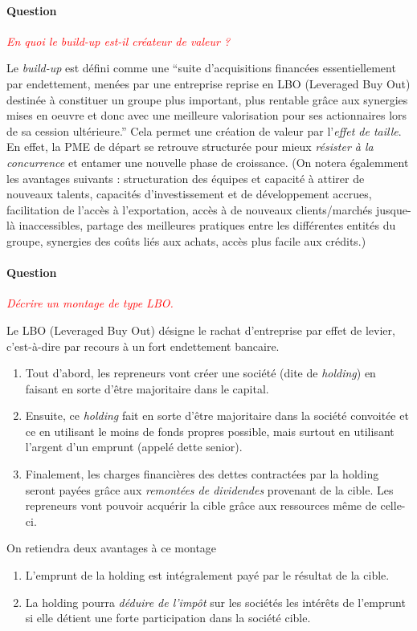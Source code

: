 \documentclass[12pt,oneside,a4paper]{article}
\newcommand{\question}[1]
{
\addtocounter{section}{1}
\paragraph*{Question \thesection}
\emph{\textcolor{red}{#1}}
}
\begin{document}
\question{En quoi le build-up est-il créateur de valeur ?}
Le \emph{build-up} est défini comme une ``suite d'acquisitions financées essentiellement
par endettement, menées par une entreprise reprise en LBO (Leveraged Buy Out) destinée 
à constituer un groupe plus important, plus rentable grâce aux synergies mises en oeuvre 
et donc avec une meilleure valorisation pour ses actionnaires lors de sa cession ultérieure.''
Cela permet une création de valeur par l'\emph{effet de taille}.
En effet, la PME de départ se retrouve structurée 
pour mieux \emph{résister à la concurrence} et entamer une nouvelle phase de croissance.
(On notera égalemment les avantages suivants : 
structuration des équipes et capacité à attirer de nouveaux talents,
capacités d’investissement et de développement accrues,
facilitation de l’accès à l’exportation, 
accès à de nouveaux clients/marchés jusque-là inaccessibles,
partage des meilleures pratiques entre les différentes entités du groupe,
synergies des coûts liés aux achats, accès plus facile aux crédits.)

\question{Décrire un montage de type LBO.}
Le LBO (Leveraged Buy Out) désigne le rachat d'entreprise par effet de levier,
c'est-à-dire par recours à un fort endettement bancaire.
\begin{enumerate}
  \item Tout d'abord, les repreneurs vont créer une société (dite de \emph{holding})
  en faisant en sorte d'être majoritaire dans le capital.
  \item Ensuite, ce \emph{holding} fait en sorte d'être majoritaire dans la société
  convoitée et ce en utilisant le moins de fonds propres possible, mais surtout
  en utilisant l'argent d'un emprunt (appelé dette senior).
  \item Finalement, les charges financières des dettes contractées par la holding
  seront payées grâce aux \emph{remontées de dividendes} provenant de la cible. 
  Les repreneurs vont pouvoir acquérir la cible grâce aux ressources même de celle-ci.
\end{enumerate}
On retiendra deux avantages à ce montage
\begin{enumerate}
  \item L'emprunt de la holding est intégralement payé par le résultat de la cible.
  \item La holding pourra \emph{déduire de l’impôt} sur les sociétés les intérêts de 
  l’emprunt si elle détient une forte participation dans la société cible.
\end{enumerate}
\end{document}
